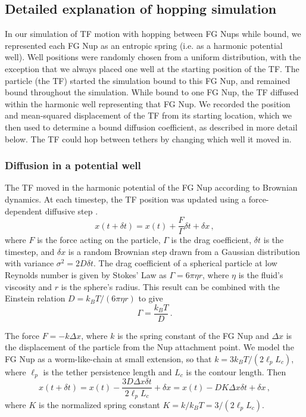 \subsection{Detailed explanation of hopping simulation}
In our simulation of TF motion with hopping between FG Nups while bound, we represented each FG Nup as an entropic spring (i.e. as a harmonic potential well).  Well positions were randomly chosen from a uniform distribution, with the exception that we always placed one well at the starting position of the TF.  The particle (the TF) started the simulation bound to this FG Nup, and remained bound throughout the simulation.  While bound to one FG Nup, the TF diffused within the harmonic well representing that FG Nup. We recorded the position and mean-squared displacement of the TF from its starting location, which we then used to determine a bound diffusion coefficient, as described in more detail below.  The TF could hop between tethers by changing which well it moved in.

\subsubsection{Diffusion in a potential well}

The TF moved in the harmonic potential of the FG Nup according to Brownian dynamics. At each timestep, the TF position was updated using a force-dependent diffusive step \cite{blackwell17}.
\begin{equation}
  x(t+\delta t) = x(t) + \frac{F}{\Gamma} \delta t + \delta x\,,
\end{equation} 
where $F$ is the force acting on the particle, $\Gamma$ is the drag coefficient, $\delta t$ is the timestep, and $\delta x$ is a random Brownian step drawn from a Gaussian distribution with variance $\sigma^2 = 2 D \delta t$. The drag coefficient of a spherical particle at low Reynolds number is given by Stokes' Law as $\Gamma = 6 \pi \eta r$, where $\eta$ is the fluid's viscosity and $r$ is the sphere's radius.  This result can be combined with the Einstein relation $D = k_B T / (6\pi \eta r)$ to give
\begin{equation}
\Gamma= \frac{k_B T}{D}\,.
\end{equation}
 
The force $F = -k\Delta x$, where $k$ is the spring constant of the FG Nup and $\Delta x$ is the displacement of the particle from the Nup attachment point.  We model the FG Nup as a worm-like-chain at small extension, so that $k = 3 k_B T/(2\ell_pL_c)$, where $\ell_p$ is the tether persistence length and $L_c$ is the contour length.  Then 
\begin{equation}
  x(t+\delta t) = x(t) - \frac{3 D \Delta x \delta t}{2\ell_p L_c }+
  \delta x = x(t) - D K \Delta x \delta t+ \delta x\,,
\end{equation}
where $K$ is the normalized spring constant $K = k/k_B T = 3/(2 \ell_p L_c)$.

